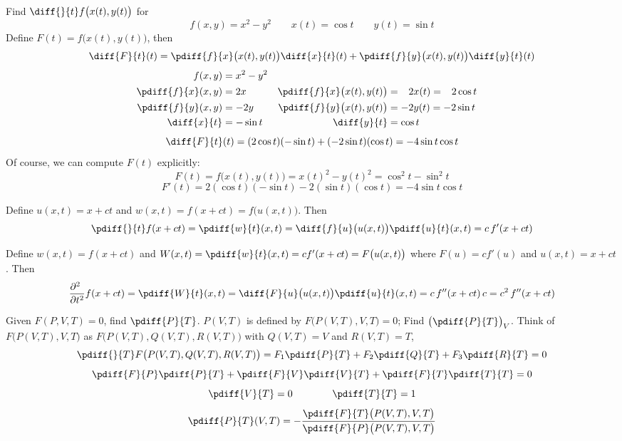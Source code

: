 \begin{eg}\label{eg:chainRuleA}
Find $\diff{}{t}f\big(x(t),y(t)\big)$ for
\begin{equation*}
f(x,y)=x^2-y^2\qquad x(t)=\cos t \qquad y(t)=\sin t
\end{equation*}
\soln
Define $F(t)=f\big(x(t),y(t)\big)$, then
$$
\diff{F}{t}(t)=
\pdiff{f}{x}\big(x(t),y(t)\big) \diff{x}{t}(t)
+\pdiff{f}{y}\big(x(t),y(t)\big) \diff{y}{t}(t)
$$
\begin{align*}
f(x,y)&=x^2-y^2  \\
\pdiff{f}{x}(x,y)&= 2x  &
\pdiff{f}{x}\big(x(t),y(t)\big)&= \phantom{-}2x(t) =\phantom{-}2\cos t  \\
\pdiff{f}{y}(x,y)&= -2y  &
\pdiff{f}{y}\big(x(t),y(t)\big)&= -2y(t)  =-2\sin t \\
\diff{x}{t}&=-\sin t &
\diff{y}{t}&=\cos t
\end{align*}
$$
\diff{F}{t}(t)=(2\cos t)(-\sin t) +(-2\sin t)(\cos t) = -4\sin t\cos t
$$
Of course, we can compute $F(t)$ explicitly:
$$
F(t)=f\big(x(t),y(t)\big)=x(t)^2-y(t)^2=\cos^2t-\sin^2t
$$
$$
F'(t)=2(\cos t)(-\sin t)-2(\sin t)(\cos t) = -4 \sin t\cos t
$$
\end{eg}
\begin{eg}[$\pdiff{}{t}f(x+ct)$]\label{eg:chainRuleB}
Define
$u(x,t)=x+ct$ and $w(x,t)=f(x+ct)=f\big(u(x,t)\big)$. Then
$$
\pdiff{}{t}f(x+ct)
=\pdiff{w}{t}(x,t)
=\diff{f}{u}\big(u(x,t)\big)  \pdiff{u}{t}(x,t)
=c\, f'(x+ct)
$$
\end{eg}
\begin{eg}\label{eg:chainRuleC}
Define  $w(x,t)=f(x+ct)$ and
$W(x,t)=\pdiff{w}{t}(x,t)=cf'(x+ct)=F\big(u(x,t)\big)$
where $F(u)=cf'(u)$ and $u(x,t)=x+ct$. Then
$$
\frac{\partial^2\hfill}{\partial t^2}f(x+ct)
=\pdiff{W}{t}(x,t)
=\diff{F}{u}\big(u(x,t)\big)  \pdiff{u}{t}(x,t)
=c\,f''(x+ct)\,c
=c^2\,f''(x+ct)
$$
\end{eg}
\begin{eg}\label{eg:chainRuleD}
Given $F(P,V,T) = 0$, find $\pdiff{P}{T}$.
\soln
$P(V,T)$ is defined by $F\big(P(V,T),V,T)=0$; Find $\big(\pdiff{P}{T}\big)_V$.
Think of $F\big(P(V,T),V,T\big)$ as $F\big(P(V,T),Q(V,T),R(V,T)\big)$ with $Q(V,T)=V$ and $R(V,T)=T$,
$$
\pdiff{}{T}F\big(P(V,T),Q(V,T),R(V,T)\big)
=F_1\pdiff{P}{T}
+F_2\pdiff{Q}{T}
+F_3\pdiff{R}{T}=0
$$
$$
\pdiff{F}{P}\pdiff{P}{T}
+\pdiff{F}{V}\pdiff{V}{T}
+\pdiff{F}{T}\pdiff{T}{T}=0
$$
$$
\pdiff{V}{T}=0\qquad\qquad \pdiff{T}{T} = 1
$$
$$
\pdiff{P}{T}(V,T)
=-\frac{\pdiff{F}{T}\big(P(V,T),V,T\big)}
{\pdiff{F}{P}\big(P(V,T),V,T\big)}
$$
\end{eg}
